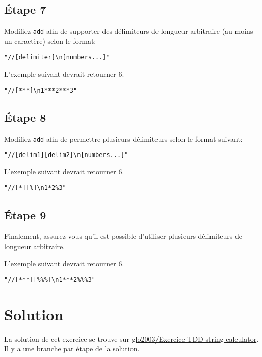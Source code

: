 \documentclass[french]{article}
\begin{document}
\subsection{Étape 7}
Modifiez \texttt{add} afin de supporter des délimiteurs de longueur arbitraire (au moins un caractère) selon le format:

\begin{lstlisting}
"//[delimiter]\n[numbers...]"
\end{lstlisting}

L'exemple suivant devrait retourner 6.

\begin{lstlisting}
"//[***]\n1***2***3"
\end{lstlisting}

\subsection{Étape 8}
Modifiez \texttt{add} afin de permettre plusieurs délimiteurs selon le format suivant:

\begin{lstlisting}
"//[delim1][delim2]\n[numbers...]"
\end{lstlisting}

L'exemple suivant devrait retourner 6.

\begin{lstlisting}
"//[*][%]\n1*2%3"
\end{lstlisting}

\subsection{Étape 9}
Finalement, assurez-vous qu'il est possible d'utiliser plusieurs délimiteurs de longueur arbitraire.

L'exemple suivant devrait retourner 6.

\begin{lstlisting}
"//[***][%%%]\n1***2%%%3"
\end{lstlisting}

\section{Solution}
La solution de cet exercice se trouve sur \href{https://github.com/glo2003/Exercice-TDD-string-calculator}{glo2003/Exercice-TDD-string-calculator}. Il y a une branche par étape de la solution.



\end{document}
